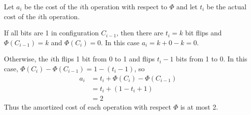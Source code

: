 Let $a_i$ be the cost of the $i$th  operation with respect to $\Phi$ and let $t_i$ be the actual cost of the $i$th  operation.

If all bits are 1 in configuration $C_{i-1}$, then there are $t_i = k$ bit flips and $\Phi(C_{i-1}) = k$ and $\Phi(C_i) = 0$. In this case $a_i = k+0-k = 0$.

Otherwise, the $i$th  flips 1 bit from 0 to 1 and flips $t_i-1$ bits from 1 to 0. In this case, $\Phi(C_i)-\Phi(C_{i-1}) = 1 - (t_i - 1)$, so
$$
\begin{aligned}
    a_i &= t_i + \Phi(C_i) - \Phi(C_{i-1}) \\
    &= t_i + (1-t_i + 1) \\
    &= 2
\end{aligned}
$$  
Thus the amortized cost of each  operation with respect $\Phi$ is at most 2.